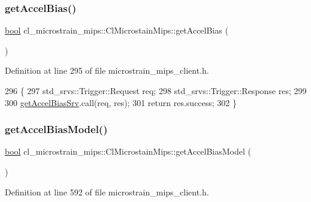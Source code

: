 \subsubsection{\texorpdfstring{get\+Accel\+Bias()}{getAccelBias()}}
{\footnotesize\ttfamily \hyperlink{classbool}{bool} cl\+\_\+microstrain\+\_\+mips\+::\+Cl\+Microstain\+Mips\+::get\+Accel\+Bias (\begin{DoxyParamCaption}{ }\end{DoxyParamCaption})\hspace{0.3cm}{\ttfamily [inline]}}



Definition at line 295 of file microstrain\+\_\+mips\+\_\+client.\+h.


\begin{DoxyCode}
296     \{
297         std\_srvs::Trigger::Request req;
298         std\_srvs::Trigger::Response res;
299 
300         \hyperlink{classcl__microstrain__mips_1_1ClMicrostainMips_a79547e77f9122ca67610f153657ec8ac}{getAccelBiasSrv}.call(req, res);
301         \textcolor{keywordflow}{return} res.success;
302     \}
\end{DoxyCode}
\mbox{\label{classcl__microstrain__mips_1_1ClMicrostainMips_a8765bf73916e6de2646aba55f3b8a5ce}} 
\subsubsection{\texorpdfstring{get\+Accel\+Bias\+Model()}{getAccelBiasModel()}}
{\footnotesize\ttfamily \hyperlink{classbool}{bool} cl\+\_\+microstrain\+\_\+mips\+::\+Cl\+Microstain\+Mips\+::get\+Accel\+Bias\+Model (\begin{DoxyParamCaption}{ }\end{DoxyParamCaption})\hspace{0.3cm}{\ttfamily [inline]}}



Definition at line 592 of file microstrain\+\_\+mips\+\_\+client.\+h.


